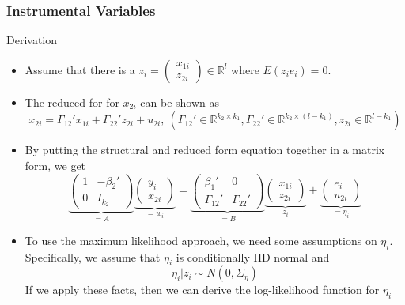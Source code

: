 \documentclass{beamer}
\begin{document}
\begin{frame}
\frametitle{Instrumental Variables}
Derivation
\begin{itemize}
\item  Assume that there is a $z_i = \begin{pmatrix} x_{1i}\\ z_{2i}\end{pmatrix}\in\mathbb{R}^l$ where $E(z_ie_i)=0$.
\item The reduced for for $x_{2i}$ can be shown as
\[
x_{2i}=\Gamma_{12}'x_{1i}+\Gamma_{22}'z_{2i}+u_{2i},\  (\Gamma_{12}'\in\mathbb{R}^{k_2\times k_1}, \Gamma_{22}'\in\mathbb{R}^{k_2\times (l-k_1)},z_{2i}\in\mathbb{R}^{l-k_1})
\]
\item By putting the structural and reduced form equation together in a matrix form, we get
\[
\underbrace{\begin{pmatrix}1 &- \beta_2' \\ 0  & I_{k_2} \end{pmatrix}}_{=A}\underbrace{\begin{pmatrix} y_i \\ x_{2i} \end{pmatrix}}_{=w_i}
= \underbrace{\begin{pmatrix}\beta_1' &0 \\ \Gamma_{12}'  & \Gamma_{22}' \end{pmatrix}}_{=B}\underbrace{\begin{pmatrix} x_{1i} \\ z_{2i} \end{pmatrix}}_{z_i} + \underbrace{\begin{pmatrix} e_i \\ u_{2i} \end{pmatrix}}_{=\eta_i}
\]
\item  To use the maximum likelihood approach, we need some assumptions on $\eta_i$. Specifically, we assume that $\eta_i$ is conditionally IID normal and
\[
\eta_i |z_i\sim N(0,\Sigma_\eta)
\]
If we apply these facts, then we can derive the log-likelihood function for $\eta_i$
\end{itemize}
\end{frame}
\end{document}
